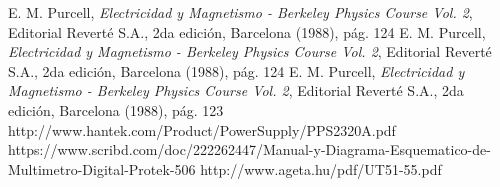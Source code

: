 \documentclass[twoside,twocolumn,a4paper]{article}
\begin{document}

\begin{thebibliography}{99} %

 E. M. Purcell, \textit{Electricidad y Magnetismo - Berkeley Physics Course Vol. 2}, Editorial Revert\'e S.A., 2da edici\'on, Barcelona (1988), p\'ag. 124
 E. M. Purcell, \textit{Electricidad y Magnetismo - Berkeley Physics Course Vol. 2}, Editorial Revert\'e S.A., 2da edici\'on, Barcelona (1988), p\'ag. 124
 E. M. Purcell, \textit{Electricidad y Magnetismo - Berkeley Physics Course Vol. 2}, Editorial Revert\'e S.A., 2da edici\'on, Barcelona (1988), p\'ag. 123
 http://www.hantek.com/Product/PowerSupply/PPS2320A.pdf
 https://www.scribd.com/doc/222262447/Manual-y-Diagrama-Esquematico-de-Multimetro-Digital-Protek-506
 http://www.ageta.hu/pdf/UT51-55.pdf
 
\end{thebibliography}

\end{document}

